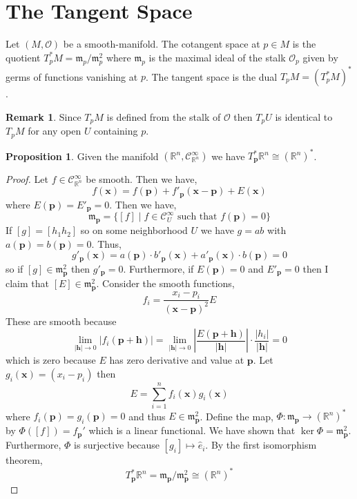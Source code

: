 \documentclass[12pt]{extarticle}
\newcommand{\R}{\mathbb{R}}
\theoremstyle{definition}
\newtheorem{proposition}[theorem]{Proposition}
\newtheorem{remark}{Remark}
\newenvironment{definition}[1][Definition:]{\begin{trivlist}
\item[\hskip \labelsep {\bfseries #1}]}{\end{trivlist}}
\renewcommand{\bf}[1]{\mathbf{#1}}
\newcommand{\C}[1]{\mathcal{C}^{#1}}
\renewcommand{\O}{\mathcal{O}}
\newcommand{\m}{\mathfrak{m}}
\begin{document}
\section{The Tangent Space}

\begin{definition}
Let $(M, \O)$ be a smooth-manifold. The cotangent space at $p\in M$ is the quotient $T_p^* M = \m_p / \m_p^2$ where $\m_p$ is the maximal ideal of the stalk $\O_p$ given by germs of functions vanishing at $p$. The tangent space is the dual $T_p M =(T_p^* M)^*$.   
\end{definition}

\begin{remark}
Since $T_p M$ is defined from the stalk of $\O$ then $T_p U$ is identical to $T_p M$ for any open $U$ containing $p$. 
\end{remark}

\begin{proposition}
Given the manifold $(\R^n, \C{\infty}_{\R^n})$ we have $T_{\bf{p}}^* \R^n \cong (\R^n)^*$. 
\end{proposition}

\begin{proof}
Let $f \in \C{\infty}_{\R^n}$ be smooth. Then we have,
\[ f(\bf{x}) = f(\bf{p}) + f'_{\bf{p}}(\bf{x} - \bf{p}) + E(\bf{x}) \]
where $E(\bf{p}) = E'_{\bf{p}} = 0$. Then we have,
\[ \m_{\bf{p}} = \{ [f] \mid f \in \C{\infty}_U \text{ such that } f(\bf{p}) = 0 \} \]
If $[g] = [h_1 h_2]$ so on some neighborhood $U$ we have $g = a b$ with $a(\bf{p}) = b(\bf{p}) = 0$. Thus,
\[ g'_{\bf{p}}(\bf{x}) = a(\bf{p}) \cdot b'_{\bf{p}}(\bf{x}) + a'_{\bf{p}}(\bf{x}) \cdot b(\bf{p}) = 0 \]
so if $[g] \in \m_{\bf{p}}^2$ then $g'_{\bf{p}} = 0$.
Furthermore, if $E(\bf{p}) = 0$ and $E'_{\bf{p}} = 0$ then I claim that $[E] \in \m_{\bf{p}}^2$. Consider the smooth functions,
\[ 
f_i = \frac{x_i - p_i}{(\bf{x} - \bf{p})^2} E \]
These are smooth because 
\[ \lim_{|\bf{h}| \to 0} |f_i(\bf{p} + \bf{h})| = \lim_{|\bf{h}| \to 0} \left| \frac{E(\bf{p} + \bf{h})}{|\bf{h}|} \right| \cdot \frac{|h_i|}{|\bf{h}|} = 0 \]
which is zero because $E$ has zero derivative and value at $\bf{p}$. Let $g_i(\bf{x}) = (x_i - p_i)$ then 
\[ E = \sum_{i = 1}^n f_i(\bf{x}) g_i(\bf{x}) \]
where $f_i(\bf{p}) = g_i(\bf{p}) = 0$ and thus $E \in \m_{\bf{p}}^2$. Define the map, $\Phi : \m_{\bf{p}} \to (\R^n)^*$ by $\Phi([f]) = f_{\bf{p}}'$ which is a linear functional. We have shown that $\ker{\Phi} = \m_{\bf{p}}^2$. Furthermore, $\Phi$ is surjective because $[g_i] \mapsto \hat{e}_i$. By the first isomorphism theorem,
\[ T_{\bf{p}}^* \R^n  = \m_{\bf{p}} / \m_{\bf{p}}^2 \cong (\R^n)^* \]
\end{proof}
\end{document}
